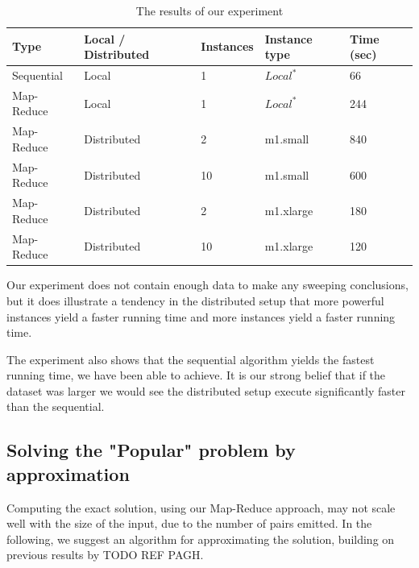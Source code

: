\documentclass[a4paper,11pt]{article}
\begin{document}
\begin{table}[h!]
\label{tab:benchmark}
\begin{center}
    \begin{tabular}{|l|l|l|l|l|}
    \hline
    Type       & Local / Distributed & Instances & Instance type                     & Time (sec) \\ \hline
    Sequential & Local               & 1         & $Local^*$ & 66                 \\ \hline
    Map-Reduce & Local               & 1         & $Local^*$ & 244                 \\ \hline
    Map-Reduce & Distributed         & 2         & m1.small                          & 840                 \\ \hline
    Map-Reduce & Distributed         & 10        & m1.small                          & 600                 \\ \hline
    Map-Reduce & Distributed         & 2         & m1.xlarge                         & 180                 \\ \hline
    Map-Reduce & Distributed         & 10        & m1.xlarge                         & 120                 \\ \hline
    \end{tabular}
    \end{center}
    \caption{The results of our experiment}
\end{table}
Our experiment does not contain enough data to make any sweeping conclusions, but it does illustrate a tendency in the distributed setup that more powerful instances yield a faster running time and more instances yield a faster running time. 

The experiment also shows that the sequential algorithm yields the fastest running time, we have been able to achieve. 
It is our strong belief that if the dataset was larger we would see the distributed setup execute significantly faster than the sequential.

\subsection{Solving the "Popular" problem by approximation}
Computing the exact solution, using our Map-Reduce approach, may not scale well with the size of the input, due to the number of pairs emitted. In the following, we suggest an algorithm for approximating the solution, building on previous results by TODO REF PAGH.
\end{document}
